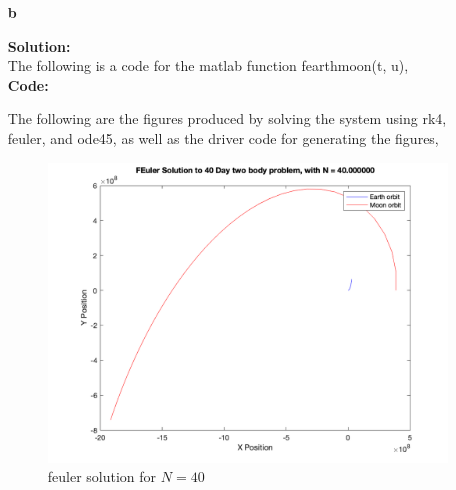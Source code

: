 \documentclass[12pt]{article}
\makeatletter
\theoremstyle{homework}
\newenvironment{exercise}[1]
{\def\@currentlabel{#1}\exercisecore}
{\endexercisecore}
\newcommand{\localhead}[1]{\par\smallskip\noindent\textbf{#1}\nobreak\\}%
\newcommand\solution{\localhead{Solution:}}
\makeatother
\begin{document}
\begin{exercise}{Problem P29}
\begin{enumerate}
  \solution Rewriting the system in the form of $u'(t) = f(t, u(t))$ with the given substitution, 
  \begin{align*}
    u'(t) &= [x'_1(t) \qquad y'_1(t) \qquad x'_2(t) \qquad y'_2(t)\qquad v'_1(t) \qquad w'_1(t) \qquad v'_2(t) \qquad w'_2(t)]^T\\
    = [&v_1(t) \quad w_1(t) \quad v_2(t) \quad w_2(t)\quad \\
    &-Gm_2\frac{x_1(t) - x_2(t)}{|x_1 - x_2|^3} \quad -Gm_2\frac{y_1(t) - y_2(t)}{|x_1 - x_2|^3} \quad -Gm_1\frac{x_2(t) - x_1(t)}{|x_1 - x_2|^3} \quad -Gm_1\frac{y_2(t) - y_1(t)}{|x_1 - x_2|^3}]^T\\
    = [&u_5(t) \quad u_6(t) \quad u_7(t) \quad u_8(t)\quad \\
    &-Gm_2\frac{u_1(t) - u_3(t)}{|x_1 - x_2|^3} \quad -Gm_2\frac{u_2(t) - u_4(t)}{|x_1 - x_2|^3} \quad -Gm_1\frac{u_3(t) - u_1(t)}{|x_1 - x_2|^3} \quad -Gm_1\frac{u_4(t) - u_2(t)}{|x_1 - x_2|^3}]^T
  \end{align*}
  Finally let $|x_1 - x_2|^3 = \left(\sqrt{(u_1(t) - u_3(t))^2 + (u_2(t) - u_4(t))^2}\right)^{3}$.

  \item[\textbf{b}]
  \solution 
  The following is a code for the matlab function fearthmoon(t, u), \\

  \textbf{Code:}
    \begin{center}
      
    \end{center}    

    The following are the figures produced by solving the system using rk4, feuler, and ode45, as well as the driver code for generating 
    the figures, 
    \begin{figure}[H]
      \begin{center}
        \caption{feuler solution for $N = 40$}
        \includegraphics[width=\textwidth]{FEulerN40.png}
      \end{center}
    \end{figure}


\end{enumerate}
\end{exercise}
\end{document}

